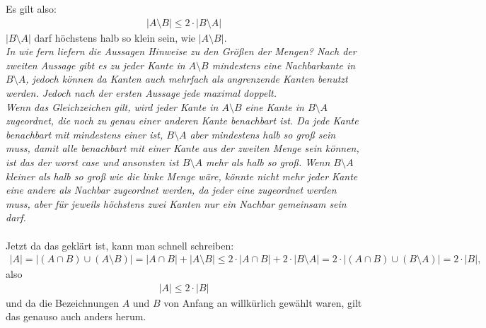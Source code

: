 \documentclass[paper=a4,10pt]{scrartcl}
\begin{document}
Es gilt also: 
\begin{align}
|A\setminus B| \le 2 \cdot |B\setminus A|
\end{align}
$|B \setminus A|$ darf höchstens halb so klein sein, wie $|A \setminus B|$.\\
\textit{In wie fern liefern die Aussagen Hinweise zu den Größen der Mengen? Nach der zweiten Aussage gibt es zu jeder Kante in $A \setminus B$ mindestens eine Nachbarkante in $B\setminus A$, jedoch können da Kanten auch mehrfach als angrenzende Kanten benutzt werden. Jedoch nach der ersten Aussage jede maximal doppelt.\\
Wenn das Gleichzeichen gilt, wird jeder Kante in $A\setminus B$ eine Kante in $B\setminus A$ zugeordnet, die noch zu genau einer anderen Kante benachbart ist. Da jede Kante benachbart mit mindestens einer ist, $B \setminus A$ aber mindestens halb so groß sein muss, damit alle benachbart mit einer Kante aus der zweiten Menge sein können, ist das der worst case und ansonsten ist $B \setminus A$ mehr als halb so groß. Wenn $B\setminus A$ kleiner als halb so groß wie die linke Menge wäre, könnte nicht mehr jeder Kante eine andere als Nachbar zugeordnet werden, da jeder eine zugeordnet werden muss, aber für jeweils höchstens zwei Kanten nur ein Nachbar gemeinsam sein darf.}\\\\
Jetzt da das geklärt ist, kann man schnell schreiben:
\begin{align*}
|A| = |(A \cap B) \cup (A\setminus B)| = |A \cap B| + |A\setminus B| \le 2\cdot |A \cap B| + 2 \cdot |B\setminus A| = 2 \cdot |(A \cap B) \cup (B \setminus A)| = 2\cdot |B|,
\end{align*}
also
\begin{align}
|A| \le 2 \cdot |B|
\end{align}
und da die Bezeichnungen $A$ und $B$ von Anfang an willkürlich gewählt waren, gilt das genauso auch anders herum.




\end{document}
